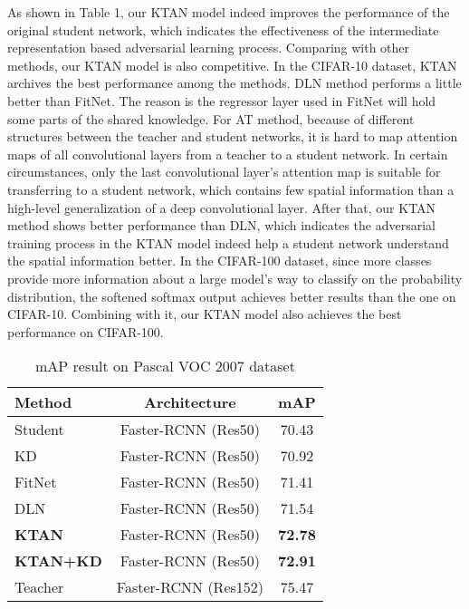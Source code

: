 \documentclass[letterpaper]{article} %
\begin{document}
As shown in Table 1, our KTAN model indeed improves the performance of the original student network, which indicates the effectiveness of the intermediate representation based adversarial learning process. Comparing with other methods, our KTAN model is also competitive. In the CIFAR-10 dataset, KTAN archives the best performance among the methods. DLN method performs a little better than FitNet. The reason is the regressor layer used in FitNet will hold some parts of the shared knowledge. For AT method, because of different structures between the teacher and student networks, it is hard to map attention maps of all convolutional layers from a teacher to a student network. In certain circumstances, only the last convolutional layer’s attention map is suitable for transferring to a student network, which contains few spatial information than a high-level generalization of a deep convolutional layer. After that, our KTAN method shows better performance than DLN, which indicates the adversarial training process in the KTAN model indeed help a student network understand the spatial information better. In the CIFAR-100 dataset, since more classes provide more information about a large model's way to classify on the probability distribution, the softened softmax output achieves better results than the one on CIFAR-10. Combining with it, our KTAN model also achieves the best performance on CIFAR-100.

\begin{table}[htb!]
	\centering
	\caption{mAP result on Pascal VOC 2007 dataset}
	\begin{tabular}{lcc}
		\hline
		\textbf{Method} & \textbf{Architecture} & \textbf{mAP} \\
		\hline
		Student & Faster-RCNN (Res50) & 70.43  \\
		KD & Faster-RCNN (Res50)  &  70.92 \\
		FitNet & Faster-RCNN (Res50)  &  71.41 \\
		DLN & Faster-RCNN (Res50)  &  71.54 \\
		\textbf{KTAN} & Faster-RCNN (Res50)  & \textbf{72.78} \\
		\hline
		\textbf{KTAN+KD} & Faster-RCNN (Res50)  & \textbf{72.91} \\
		\hline
		Teacher & Faster-RCNN (Res152)  & 75.47  \\
		\hline
	\end{tabular}
\end{table}
\end{document}
